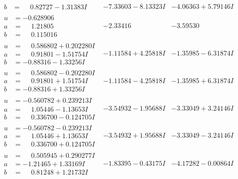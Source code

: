 \documentclass[1p]{elsarticle_modified}
\theoremstyle{definition}
\begin{document}
$$\begin{array}{c|c|c}
\begin{aligned}
b &= \phantom{-}0.82727 - 1.31383 I\end{aligned}
 & -7.33603 - 8.13323 I & -4.06363 + 5.79146 I \\ \hline\begin{aligned}
u &= -0.628906\phantom{ +0.000000I} \\
a &= \phantom{-}1.21805\phantom{ +0.000000I} \\
b &= \phantom{-}0.115016\phantom{ +0.000000I}\end{aligned}
 & -2.33416\phantom{ +0.000000I} & -3.59530\phantom{ +0.000000I} \\ \hline\begin{aligned}
u &= \phantom{-}0.586802 + 0.202280 I \\
a &= \phantom{-}0.91801 - 1.51754 I \\
b &= -0.88316 - 1.33256 I\end{aligned}
 & -1.11584 + 4.25818 I & -1.35985 - 6.31874 I \\ \hline\begin{aligned}
u &= \phantom{-}0.586802 - 0.202280 I \\
a &= \phantom{-}0.91801 + 1.51754 I \\
b &= -0.88316 + 1.33256 I\end{aligned}
 & -1.11584 - 4.25818 I & -1.35985 + 6.31874 I \\ \hline\begin{aligned}
u &= -0.560782 + 0.239213 I \\
a &= \phantom{-}1.05446 - 1.13653 I \\
b &= \phantom{-}0.336700 - 0.124705 I\end{aligned}
 & -3.54932 - 1.95688 I & -3.33049 + 3.24146 I \\ \hline\begin{aligned}
u &= -0.560782 - 0.239213 I \\
a &= \phantom{-}1.05446 + 1.13653 I \\
b &= \phantom{-}0.336700 + 0.124705 I\end{aligned}
 & -3.54932 + 1.95688 I & -3.33049 - 3.24146 I \\ \hline\begin{aligned}
u &= \phantom{-}0.505945 + 0.290277 I \\
a &= -1.21465 + 1.33169 I \\
b &= \phantom{-}0.81248 + 1.21732 I\end{aligned}
 & -1.83395 - 0.43175 I & -4.17282 - 0.00864 I \\ \hline\begin{aligned}

\end{aligned}
\end{array}$$
\end{document}
